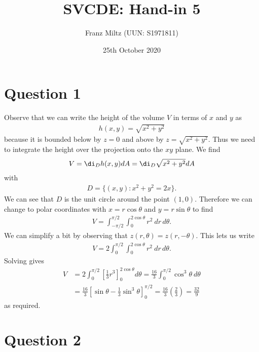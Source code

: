 \documentclass{article}
\begin{document}
\title{SVCDE: Hand-in 5}
\author{Franz Miltz (UUN: S1971811)}
\date{25th October 2020}
\maketitle


\section*{Question 1}


Observe that we can write the height of the volume $V$ in terms of $x$ and $y$ as
\begin{align*}
	h(x,y) = \sqrt{x^2 + y^2}
\end{align*}
because it is bounded below by $z=0$ and above by $z=\sqrt{x^2 + y^2}$.
Thus we need to integrate the height over the projection onto the $xy$ plane. We find
\begin{align*}
	V = \di_D h(x,y)dA = \di_D \sqrt{x^2+y^2}dA
\end{align*}
with
\begin{align*}
	D = \{(x,y) : x^2 + y^2 = 2x\}.
\end{align*}
We can see that $D$ is the unit circle around the point $(1,0)$. Therefore we can
change to polar coordinates with $x=r\cos\theta$ and $y=r\sin\theta$ to find
\begin{align*}
	V = \int_{-\pi/2}^{\pi/2}\int_0^{2\cos\theta} r^2\: dr\,d\theta.
\end{align*}
We can simplify a bit by observing that $z(r,\theta)=z(r,-\theta)$. This lets us write
\begin{align*}
	V = 2\int_{0}^{\pi/2}\int_0^{2\cos \theta} r^2\: dr\,d\theta.
\end{align*}
Solving gives
\begin{align*}
	V & = 2\int_0^{\pi/2}\left[\frac{1}{3}r^3\right]_0^{2\cos \theta}d\theta
	=\frac{16}{3}\int_0^{\pi/2}\cos^3 \theta\:d\theta                              \\
	  & =\frac{16}{3}\left[\sin \theta - \frac{1}{3}\sin^3 \theta\right]_0^{\pi/2}
	=\frac{16}{3}\left(\frac{2}{3}\right) = \frac{32}{9}
\end{align*}
as required.


\section*{Question 2}
\end{document}
